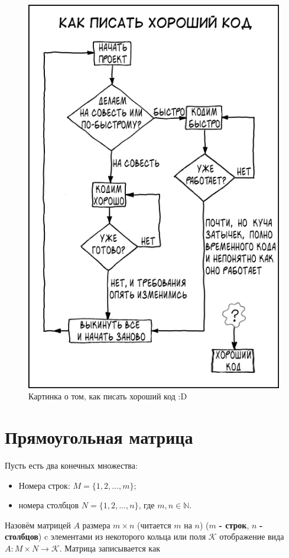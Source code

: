 \documentclass[a4paper, 12pt]{article} %
\begin{document}
\begin{figure}[h!]
    \centering \includegraphics[scale=0.4]{img/2.png}
    \caption{Картинка о том, как писать хороший код :D}
\end{figure}

\clearpage

\section*{Прямоугольная матрица}
Пусть есть два конечных множества:
\begin{itemize}
    \item Номера строк: $M = \{1, 2, ..., m\};$
    \item номера столбцов $N = \{1, 2, ..., n\}$, где $m, n \in \mathbb{N}$.
\end{itemize}

Назовём матрицей $A$ размера $m \times n$ (читается $m$ на $n$) ($m$ \textbf{- строк}, $n$ \textbf{- столбцов}) c элементами из некоторого кольца или поля $\mathcal{K}$ отображение вида $A: M \times N \to \mathcal{K}$. Матрица записывается как
\end{document}
